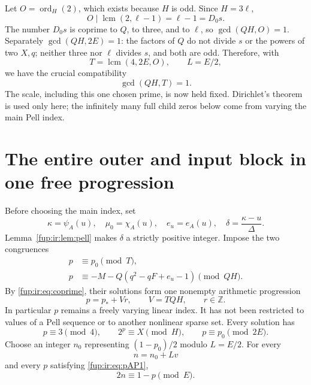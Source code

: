 \documentclass[11pt,letterpaper]{article}
\theoremstyle{definition}\newtheorem{definition}[theorem]{Definition}
\theoremstyle{remark}\newtheorem{remark}[theorem]{Remark}
\newcommand{\Z}{\mathbb Z}\newcommand{\Np}{\mathbb Z_{>0}}
\newcommand{\ord}{\operatorname{ord}}
\newcommand{\lcm}{\operatorname{lcm}}
\begin{document}
Let $O=\ord_H(2)$, which exists because $H$ is odd. Since $H=3\ell$,
\[
 O\mid\lcm(2,\ell-1)=\ell-1=D_0s.
\]
The number $D_0s$ is coprime to $Q$, to three, and to $\ell$, so $\gcd(QH,O)=1$. Separately $\gcd(QH,2E)=1$: the factors of $Q$ do not divide $s$ or the powers of two $X,q$; neither three nor $\ell$ divides $s$, and both are odd. Therefore, with
\begin{equation}\label{fup:ir:eq:TL}
 T=\lcm(4,2E,O),\qquad L=E/2,
\end{equation}
we have the crucial compatibility
\begin{equation}\label{fup:ir:eq:coprime}
 \gcd(QH,T)=1.
\end{equation}
The scale, including this one chosen prime, is now held fixed. Dirichlet's theorem is used only here; the infinitely many full child zeros below come from varying the main Pell index.

\section{The entire outer and input block in one free progression}\label{fup:ir:sec:crt}
Before choosing the main index, set
\begin{equation}\label{fup:ir:eq:inputchoices}
 \kappa=\psi_A(u),\quad\mu_0=\chi_A(u),\quad
 e_u=e_A(u),\quad\delta=\frac{\kappa-u}{\Delta}.
\end{equation}
Lemma~\ref{fup:ir:lem:pell} makes $\delta$ a strictly positive integer. Impose the two congruences
\begin{align}
 p&\equiv p_0\pmod T,\label{fup:ir:eq:pAP1}\\
 p&\equiv-M-Q(q^2-qF+e_u-1)\pmod{QH}.\label{fup:ir:eq:pAP2}
\end{align}
By \eqref{fup:ir:eq:coprime}, their solutions form one nonempty arithmetic progression
\begin{equation}\label{fup:ir:eq:freeAP}
 p=p_*+Vr,\qquad V=TQH,\qquad r\in\Z.
\end{equation}
In particular $p$ remains a freely varying linear index. It has not been restricted to values of a Pell sequence or to another nonlinear sparse set. Every solution has
\begin{equation}\label{fup:ir:eq:pconditions}
 p\equiv3\pmod4,\qquad 2^p\equiv X\pmod H,\qquad p\equiv p_0\pmod{2E}.
\end{equation}
Choose an integer $n_0$ representing $(1-p_0)/2$ modulo $L=E/2$. For every
\begin{equation}\label{fup:ir:eq:nAP}
 n=n_0+Lv
\end{equation}
and every $p$ satisfying \eqref{fup:ir:eq:pAP1},
\begin{equation}\label{fup:ir:eq:kncong}
 2n\equiv1-p\pmod E.
\end{equation}
\end{document}
